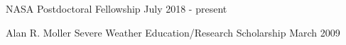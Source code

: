
\begin{cvskills}
  \cvskill
    {NASA Postdoctoral Fellowship} %
    {July 2018 - present} %

  \cvskill
    {Alan R. Moller Severe Weather Education/Research Scholarship} %
    {March 2009} %
\end{cvskills}
